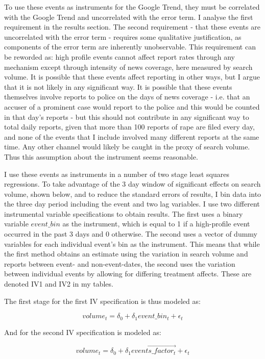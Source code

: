 \documentclass[AER,draftmode]{AEA}
\begin{document}
To use these events as instruments for the Google Trend, they must be correlated with the Google Trend and uncorrelated with the error term. I analyse the first requirement in the results section. The second requirement - that these events are uncorrelated with the error term - requires some qualitative justification, as components of the error term are inherently unobservable. This requirement can be reworded as: high profile events cannot affect report rates through any mechanism except through intensity of news coverage, here measured by search volume. It is possible that these events affect reporting in other ways, but I argue that it is not likely in any significant way. It is possible that these events themselves involve reports to police on the days of news coverage - i.e. that an accuser of a prominent case would report to the police and this would be counted in that day's reports - but this should not contribute in any significant way to total daily reports, given that more than 100 reports of rape are filed every day, and none of the events that I include involved many different reports at the same time. Any other channel would likely be caught in the proxy of search volume. Thus this assumption about the instrument seems reasonable.

I use these events as instruments in a number of two stage least squares regressions. To take advantage of the 3 day window of significant effects on search volume, shown below, and to reduce the standard errors of results, I bin data into the three day period including the event and two lag variables. I use two different instrumental variable specifications to obtain results. The first uses a binary variable $event\_bin$ as the instrument, which is equal to 1 if a high-profile event occurred in the past 3 days and 0 otherwise. The second uses a vector of dummy variables for each individual event's bin as the instrument. This means that while the first method obtains an estimate using the variation in search volume and reports between event- and non-event-dates, the second uses the variation between individual events by allowing for differing treatment affects. These are denoted IV1 and IV2 in my tables.

The first stage for the first IV specification is thus modeled as:

$$ 
volume_{t} = \delta_{0} + \delta_1 event\_bin_t + \epsilon_{t}
$$

And for the second IV specification is modeled as:

$$ 
volume_{t} = \delta_{0} + \delta_1 \vec{events\_factor_t} + \epsilon_{t}
$$
\end{document}
